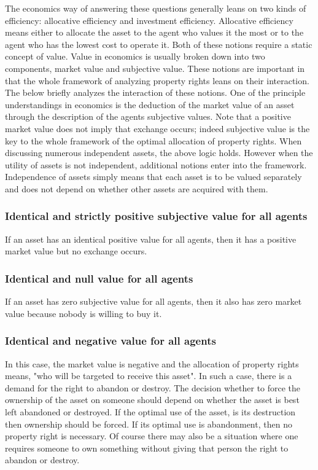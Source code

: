 The economics way of answering these questions generally leans on two kinds of efficiency: allocative efficiency and investment efficiency. Allocative efficiency means either to allocate the asset to the agent who values it the most or to the agent who has the lowest cost to operate it. Both of these notions require a static concept of value. Value in economics is usually broken down into two components, market value and subjective value. These notions are important in that the whole framework of analyzing property rights leans on their interaction. The below briefly analyzes the interaction of these notions. One of the principle understandings in economics is the deduction of the market value of an asset through the description of the agents subjective values. Note that a positive market value does not imply that exchange occurs; indeed subjective value is the key to the whole framework of the optimal allocation of property rights. When discussing numerous independent assets, the above logic holds. However when the utility of assets is not independent, additional notions enter into the framework. Independence of assets simply means that each asset is to be valued separately and does not depend on whether other assets are acquired with them.


\subsubsection{Identical and strictly positive subjective value for all agents}

If an asset has an identical positive value for all agents, then it has a positive market value but no exchange occurs.

\subsubsection{Identical and null value for all agents}

If an asset has zero subjective value for all agents, then it also has zero market value because nobody is willing to buy it.

\subsubsection{Identical and negative value for all agents}

In this case, the market value is negative and the allocation of property rights means,  "who will be targeted to receive this asset". In such a case, there is a demand for the right to abandon or destroy. The decision whether to force the ownership of the asset on someone should depend on whether the asset is best left abandoned or destroyed. If the optimal use of the asset, is its destruction then ownership should be forced. If its optimal use is abandonment, then no property right is necessary. Of course there may also be a situation where one requires someone to own something without giving that person the right to abandon or destroy.

